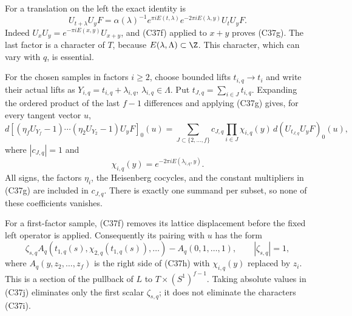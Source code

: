 \documentclass[11pt]{article}
\theoremstyle{definition}\newtheorem{definition}[theorem]{Definition}\newtheorem{remark}[theorem]{Remark}
\begin{document}
For a translation on the left the exact identity is
\[
 U_{t+\lambda}U_yF
   =\alpha(\lambda)^{-1}e^{\pi iE(t,\lambda)}
       e^{-2\pi iE(\lambda,y)}U_tU_yF.
 \tag{C37g}
\]
Indeed $U_xU_y=e^{-\pi iE(x,y)}U_{x+y}$, and (C37f) applied
to $x+y$ proves (C37g).  The last factor is a character of $T$,
because $E(\lambda,\Lambda)\subset\Z$.  This character, which
can vary with $q$, is essential.

For the chosen samples in factors $i\ge2$, choose bounded lifts
$t_{i,q}\to t_i$ and write their actual lifts as
$Y_{i,q}=t_{i,q}+\lambda_{i,q}$, $\lambda_{i,q}\in\Lambda$.
Put $t_{J,q}=\sum_{i\in J}t_{i,q}$.  Expanding the ordered product
of the last $f-1$ differences and applying (C37g) gives, for every
tangent vector $u$,
\[
 d\left[
  (\eta_fU_{Y_f}-1)\cdots(\eta_2U_{Y_2}-1)U_yF
       \right]_0(u)
   =\sum_{J\subset\{2,\ldots,f\}}
         c_{J,q}\prod_{i\in J}\chi_{i,q}(y)\,
               d(U_{t_{J,q}}U_yF)_0(u),
 \tag{C37h}
\]
where $|c_{J,q}|=1$ and
\[
       \chi_{i,q}(y)=e^{-2\pi iE(\lambda_{i,q},y)}.
 \tag{C37i}
\]
All signs, the factors $\eta_i$, the Heisenberg cocycles, and the
constant multipliers in (C37g) are included in $c_{J,q}$.
There is exactly one summand per subset, so none of these
coefficients vanishes.

For a first-factor sample, (C37f) removes its lattice displacement
before the fixed left operator is applied.  Consequently its
pairing with $u$ has the form
\[
       \zeta_{s,q}A_q(t_{1,q}(s),\chi_{2,q}(t_{1,q}(s)),\ldots)
                       -A_q(0,1,\ldots,1),
       \qquad |\zeta_{s,q}|=1,
 \tag{C37j}
\]
where $A_q(y,z_2,\ldots,z_f)$ is the right side of (C37h) with
$\chi_{i,q}(y)$ replaced by $z_i$.  This is a section of the
pullback of $L$ to $T\times(S^1)^{f-1}$.  Taking absolute values
in (C37j) eliminates only the first scalar $\zeta_{s,q}$; it does
not eliminate the characters (C37i).
\end{document}
